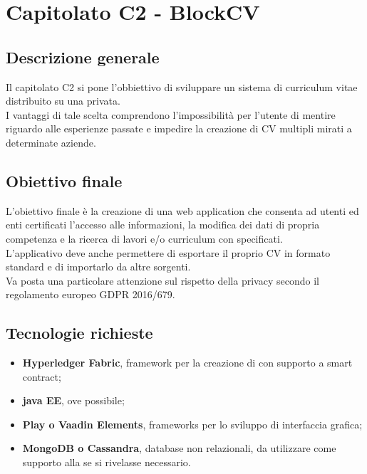 \documentclass[StudioDiFattibilità.tex]{subfiles}
\begin{document}
\chapter{Capitolato C2 - BlockCV}
\section{Descrizione generale}
Il capitolato C2 si pone l'obbiettivo di sviluppare un sistema di curriculum vitae distribuito su una  privata.\\
I vantaggi di tale scelta comprendono l'impossibilità per l'utente di mentire riguardo alle esperienze passate e impedire la creazione di CV multipli mirati a determinate aziende.
\section{Obiettivo finale}
L'obiettivo finale è la creazione di una web application che consenta ad utenti ed enti certificati l'accesso alle informazioni, la modifica dei dati di propria competenza e la ricerca di lavori e/o curriculum con  specificati.\\
L'applicativo deve anche permettere di esportare il proprio CV in formato standard e di importarlo da altre sorgenti.\\
Va posta una particolare attenzione sul rispetto della privacy secondo il regolamento europeo GDPR 2016/679.
\section{Tecnologie richieste}
\begin{itemize}
	\item \textbf{Hyperledger Fabric}, framework per la creazione di  con supporto a smart contract;
	\item \textbf{java EE}, ove possibile;
	\item \textbf{Play o Vaadin Elements}, frameworks per lo sviluppo di interfaccia grafica;
	\item \textbf{MongoDB o Cassandra}, database non relazionali, da utilizzare come supporto alla  se si rivelasse necessario.
\end{itemize}
\end{document}
